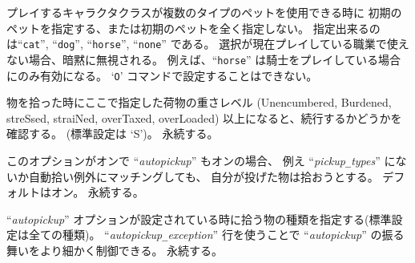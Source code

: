 \item[\ib{pettype}]
プレイするキャラクタクラスが複数のタイプのペットを使用できる時に
初期のペットを指定する、または初期のペットを全く指定しない。
指定出来るのは``{\tt cat}'', ``{\tt dog}'', ``{\tt horse}'', ``{\tt none}'' である。
選択が現在プレイしている職業で使えない場合、暗黙に無視される。
例えば、``{\tt horse}'' は騎士をプレイしている場合にのみ有効になる。
`{\tt O}' コマンドで設定することはできない。
\item[\ib{pickup\verb+_+burden}]
物を拾った時にここで指定した荷物の重さレベル
(Unencumbered, Burdened, streSsed, straiNed, overTaxed, overLoaded)
以上になると、続行するかどうかを確認する。
(標準設定は `S')。
永続する。
\item[\ib{pickup\verb+_+thrown}]
このオプションがオンで
``{\it autopickup\/}''
もオンの場合、
例え
``{\it pickup\verb+_+types\/}''
にないか自動拾い例外にマッチングしても、
自分が投げた物は拾おうとする。
デフォルトはオン。
永続する。
\item[\ib{pickup\verb+_+types}]
``{\it autopickup\/}''
オプションが設定されている時に拾う物の種類を指定する(標準設定は全ての種類)。
``{\it autopickup\verb+_+exception\/}''
行を使うことで
``{\it autopickup\/}''
の振る舞いをより細かく制御できる。
永続する。
\item[\ib{pile\verb+_+limit}]
